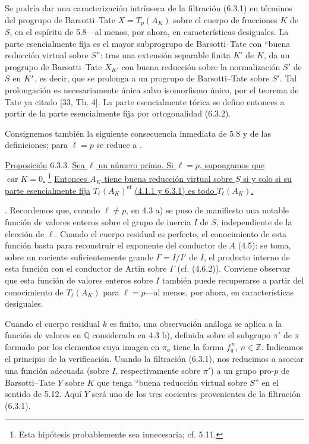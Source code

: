 Se podría dar una caracterización intrínseca de la filtración (6.3.1)
en términos del progrupo de Barsotti--Tate $X=T_p(A_K)$ sobre el cuerpo
de fracciones $K$ de $S$, en el espíritu de 5.8---al menos, por ahora,
en características desiguales. La parte esencialmente fija es el mayor
subprogrupo de Barsotti--Tate con ``buena reducción virtual sobre $S$'':
tras una extensión separable finita $K'$ de $K$, da un progrupo de
Barsotti--Tate $X_{K'}$ con buena reducción sobre la normalización $S'$
de $S$ en $\sisi{K}{K'}$, es decir, que se prolonga a un progrupo de
Barsotti--Tate sobre $S'$. Tal prolongación es necesariamente única
salvo isomorfismo único, por el teorema de Tate ya citado [33, Th. 4].
La parte esencialmente tórica se define entonces a partir de la parte
esencialmente fija por ortogonalidad (6.3.2).

Consignemos también la siguiente consecuencia inmediata de 5.8 y de
las definiciones; para $\ell=p$ se reduce a
.

\medskip
\noindent
\underline{Proposición} 6.3.3. \underline{Sea $\ell$ un número primo.
Si $\ell=p$, supongamos que $\operatorname{car}K=0$.}
\footnote{Esta hipótesis probablemente sea innecesaria; cf. 5.11.}
\underline{Entonces $A_K$ tiene buena reducción virtual sobre $S$
 si y solo si su parte esencialmente fija}
$T_\ell(A_K)^{\mathrm{ef}}$
\underline{(4.1.1 y 6.3.1) es todo $T_\ell(A_K)$.}


\medskip
{}. Recordemos que, cuando $\ell\neq p$, en 4.3 a) se puso de
manifiesto una notable función de valores enteros sobre el grupo de
inercia $I$ de $S$, independiente de la elección de $\ell$. Cuando el
cuerpo residual es perfecto, el conocimiento de esta función basta
para reconstruir el exponente del conductor de $A$ (4.5): se toma,
sobre un cociente suficientemente grande $\Gamma=I/I'$ de $I$, el
producto interno de esta función con el conductor de Artin sobre
$\Gamma$ (cf. (4.6.2)). Conviene observar que esta función de valores
enteros sobre $I$ también puede recuperarse a partir del conocimiento
de $T_\ell(A_K)$ para $\ell=p$---al menos, por ahora, en características
desiguales.

Cuando el cuerpo residual $k$ es finito, una observación análoga se
aplica a la función de valores en $\mathbb Q$ considerada en 4.3 b),
definida sobre el subgrupo $\pi'$ de $\pi$ formado por los elementos
cuya imagen en $\pi_o$ tiene la forma $f_q^{\,n}$,
$n\in\mathbb Z$. Indicamos el principio de la verificación. Usando la
filtración (6.3.1), nos reducimos a asociar una función adecuada (sobre
$I$, respectivamente sobre $\pi'$) a un grupo pro-$p$ de
Barsotti--Tate $Y$ sobre $K$ que tenga ``buena reducción virtual sobre
$S$'' en el sentido de 5.12. Aquí $Y$ será uno de los tres cocientes
provenientes de la filtración (6.3.1).

